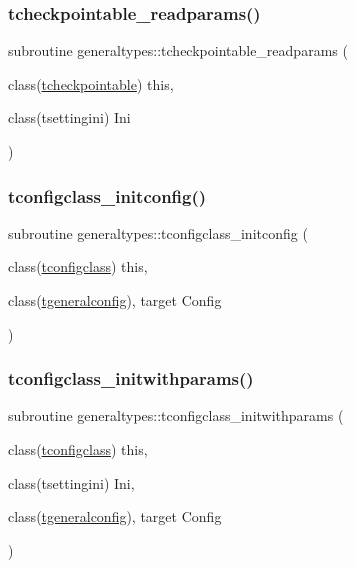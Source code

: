 \subsubsection{\texorpdfstring{tcheckpointable\+\_\+readparams()}{tcheckpointable\_readparams()}}
{\footnotesize\ttfamily subroutine generaltypes\+::tcheckpointable\+\_\+readparams (\begin{DoxyParamCaption}\item[{class(\mbox{\hyperlink{structgeneraltypes_1_1tcheckpointable}{tcheckpointable}})}]{this,  }\item[{class(tsettingini)}]{Ini }\end{DoxyParamCaption})\hspace{0.3cm}{\ttfamily [private]}}

\mbox{\label{namespacegeneraltypes_a55eb95d894b131cff41c56b99c9f87cc}} 
\subsubsection{\texorpdfstring{tconfigclass\+\_\+initconfig()}{tconfigclass\_initconfig()}}
{\footnotesize\ttfamily subroutine generaltypes\+::tconfigclass\+\_\+initconfig (\begin{DoxyParamCaption}\item[{class(\mbox{\hyperlink{structgeneraltypes_1_1tconfigclass}{tconfigclass}})}]{this,  }\item[{class(\mbox{\hyperlink{structgeneraltypes_1_1tgeneralconfig}{tgeneralconfig}}), target}]{Config }\end{DoxyParamCaption})\hspace{0.3cm}{\ttfamily [private]}}

\mbox{\label{namespacegeneraltypes_ab4499296c04e7fca434f77eecbccea27}} 
\subsubsection{\texorpdfstring{tconfigclass\+\_\+initwithparams()}{tconfigclass\_initwithparams()}}
{\footnotesize\ttfamily subroutine generaltypes\+::tconfigclass\+\_\+initwithparams (\begin{DoxyParamCaption}\item[{class(\mbox{\hyperlink{structgeneraltypes_1_1tconfigclass}{tconfigclass}})}]{this,  }\item[{class(tsettingini)}]{Ini,  }\item[{class(\mbox{\hyperlink{structgeneraltypes_1_1tgeneralconfig}{tgeneralconfig}}), target}]{Config }\end{DoxyParamCaption})\hspace{0.3cm}{\ttfamily [private]}}


